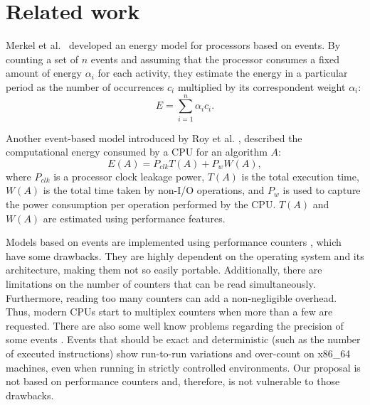 \documentclass{ieeeaccess}
\begin{document}
\section{Related work} \label{sec:relatedwork}

Merkel et al.~\cite{Merkel2006BalancingSystems} developed an energy model for processors based on events. By counting a set of $n$ events and assuming that the processor consumes a fixed amount of energy $\alpha_i$ for each activity, they estimate the energy in a particular period as the number of occurrences $c_i$  multiplied by its correspondent weight $\alpha_i$:
\begin{equation}
    E = \sum_{i=1}^{n}\alpha_ic_i.
\end{equation}

Another event-based model introduced by Roy et al. \cite{Roy2013AnAlgorithms}, described the computational energy consumed by a CPU for an algorithm $A$:
\begin{equation}
    E(A) = P_{clk}T(A) + P_wW(A),
\end{equation}
where $P_{clk}$ is a processor clock leakage power, $T(A)$ is the total execution time, $W(A)$ is the total time taken by  non-I/O operations, and $P_w$ is used to capture the power consumption per operation performed by the CPU. $T(A)$ and $W(A)$ are estimated using performance features.

Models based on events are implemented using performance counters \cite{Fahad2019AComputing}, which have some drawbacks. They are highly dependent on the operating system and its architecture, making them not so easily portable. Additionally, there are limitations on the number of counters that can be read simultaneously. Furthermore, reading too many counters can add a non-negligible overhead. Thus, modern CPUs start to multiplex counters when more than a few are requested. There are also some well know problems regarding the precision of some events \cite{Weaver2008, Weaver2013a, Das2019SoK:Security, McGuire2009, Ramos2019AnCounters, Silva-De-Souza2020Containergy-aWorkloads}. Events that should be exact and deterministic (such as the number of executed instructions) show run-to-run variations and over-count on x86\_64 machines, even when running in strictly controlled environments. Our proposal is not based on performance counters and, therefore, is not vulnerable to those drawbacks.
\end{document}
